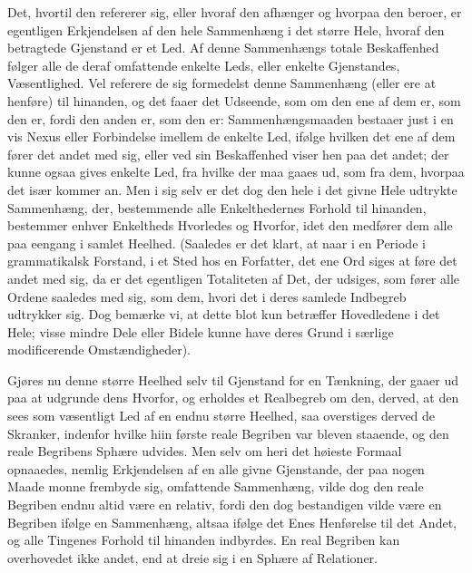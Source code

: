 \documentclass[12pt]{book}
\def\textit#1{#1}%
\def\emph#1{#1}%
\newcommand{\opage}[1]{\marginnote{\footnotesize\textit{[#1]}}}
\begin{document}
\opage{53} Det, hvortil den refererer sig, eller hvoraf den afhænger og hvorpaa den
beroer, er egentligen Erkjendelsen af den hele Sammenhæng i det større Hele,
hvoraf den betragtede Gjenstand er et Led. Af denne Sammenhængs totale
Beskaffenhed følger alle de deraf omfattende enkelte Leds, eller enkelte
Gjenstandes, Væsentlighed. Vel referere de sig formedelst denne Sammenhæng
(eller ere at henføre) \emph{til hinanden}, og det faaer det Udseende, som om
den ene af dem er, som den er, fordi den anden er, som den er:
Sammenhængsmaaden bestaaer just i en vis Nexus eller Forbindelse imellem de
enkelte Led, ifølge hvilken det ene af dem fører det andet med sig, eller ved
sin Beskaffenhed viser hen paa det andet; der kunne ogsaa gives enkelte Led,
fra hvilke der maa gaaes ud, som fra dem, hvorpaa det især kommer an. Men i sig
selv er det dog den hele i det givne Hele udtrykte Sammenhæng, der, bestemmende
alle Enkelthedernes Forhold til hinanden, bestemmer enhver Enkeltheds Hvorledes
og Hvorfor, idet den medfører dem alle paa eengang i samlet Heelhed. (Saaledes
er det klart, at naar i en Periode i grammatikalsk Forstand, i et Sted hos en
Forfatter, det ene Ord siges at føre det andet med sig, da er det egentligen
Totaliteten af Det, der udsiges, som fører alle Ordene saaledes med sig, som
dem, hvori det i deres samlede Indbegreb udtrykker sig.
Dog bemærke vi, at
dette blot kun betræffer Hovedledene i det Hele;
\opage{54} visse mindre Dele eller Bidele kunne have deres Grund i særlige modificerende
Omstændigheder).

Gjøres nu denne større Heelhed selv til Gjenstand for en Tænkning, der gaaer ud
paa at udgrunde dens Hvorfor, og erholdes et Realbegreb om den, derved, at den
sees som væsentligt Led af en endnu større Heelhed, saa overstiges derved de
Skranker, indenfor hvilke hiin første reale Begriben var bleven staaende, og
den reale Begribens Sphære udvides. Men selv om heri det høieste Formaal
opnaaedes, nemlig Erkjendelsen af en alle givne Gjenstande, der paa nogen Maade
monne frembyde sig, omfattende Sammenhæng, vilde dog den reale Begriben endnu
altid være en \emph{relativ}, fordi den dog bestandigen vilde være en Begriben
ifølge en Sammenhæng, altsaa ifølge det Enes Henførelse til det Andet, og alle
Tingenes Forhold til hinanden indbyrdes. En real Begriben kan overhovedet ikke
andet, end at dreie sig i en Sphære af Relationer.
\end{document}
